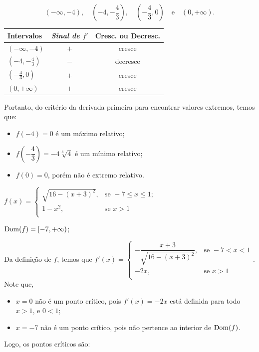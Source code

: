\cleardoublepage\documentclass[../main.tex]{subfiles}
\begin{document}
\begin{ex}
\begin{compactenum}[a)]
\begin{solution}
\begin{compactenum}[1.]
\[ (-\infty,-4),\quad\left(-4,-\dfrac{4}{3}\right),\quad \left(-\dfrac{4}{3},0\right)\quad \mbox{e}\quad (0,+\infty). \]
\begin{center}
  \begin{tabular}{l|c|c}
  \toprule
    \textbf{Intervalos} &	\emph{Sinal de \(f'\)} &	\textbf{Cresc. ou Decresc.}\\\hline
\((-\infty,-4)\) &\(+\)& cresce\\\hline
\(\left(-4,-\frac{4}{3}\right)\)&\(-\)&decresce\\\hline
\(\left(-\frac{4}{3},0\right)\) & \(+\) & cresce\\\hline
\((0,+\infty)\)&\(+\)& cresce\\
\bottomrule
  \end{tabular}
  \end{center}
   \end{compactenum}
Portanto, do critério da derivada primeira para encontrar valores extremos, temos que:
\begin{itemize}
    \item \(f(-4)=0 \) é um máximo relativo;
\item \(f\left(-\dfrac{4}{3}\right)=-4\sqrt[3]{4}\) é um mínimo relativo;
\item \(f(0)=0\), porém não é extremo relativo.
\end{itemize}
 \end{solution}
 \item \(f(x)=\left\{\begin{array}{ll} \sqrt{16-(x+3)^2},& \mbox{se }-7\leq x\leq 1;\\ 1-x^2,& \mbox{se }x> 1\\ \end{array}\right.\)
 
 \begin{solution}
 \begin{compactenum}[1.]
 \item \({\rm Dom}(f)=[-7,+\infty)\);
\item Da definição de \(f\), temos que \(f'(x)=\left\{\begin{array}{ll} -\dfrac{x+3}{\sqrt{16-(x+3)^2}},& \mbox{se }-7<x< 1\\ -2x,& \mbox{se }x> 1\\ \end{array}\right.\).
Note que,
\begin{itemize}
    \item \(x=0\) não é um ponto crítico, pois \(f'(x)=-2x\) está definida para todo \(x>1\), e \(0<1\);
    \item \(x=-7\) não é um ponto crítico, pois não pertence ao interior de \({\rm Dom}(f)\).
    \end{itemize}
    Logo, os pontos críticos são:


\end{compactenum}
\end{solution}
\end{compactenum}
\end{ex}
\end{document}
